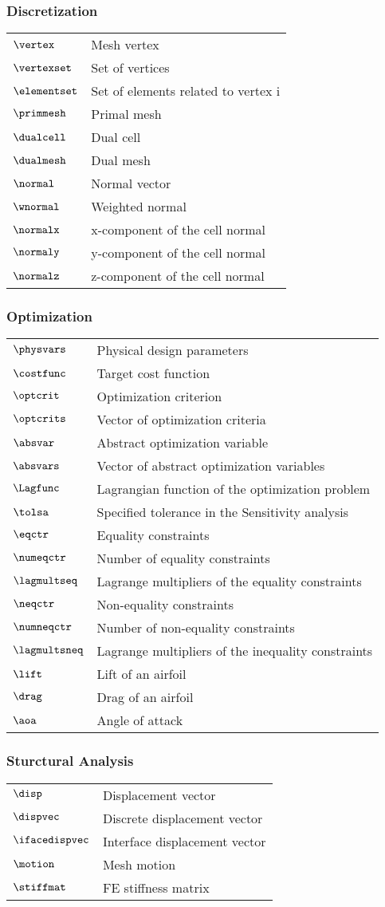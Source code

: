 \subsubsection*{Discretization}
\begin{tabular}{l l}
$\vertex$ & Mesh vertex\\
$\vertexset$ & Set of vertices\\
$\elementset$ & Set of elements related to vertex i\\
$\primmesh$ & Primal mesh\\
$\dualcell$ & Dual cell\\
$\dualmesh$ & Dual mesh\\
$\normal$ & Normal vector\\
$\wnormal$ & Weighted normal\\
$\normalx$ & x-component of the cell normal\\
$\normaly$ & y-component of the cell normal\\
$\normalz$ & z-component of the cell normal
\end{tabular}

\subsubsection*{Optimization}
\begin{tabular}{l l}
$\physvars$ & Physical design parameters\\
$\costfunc$ & Target cost function\\
$\optcrit$ & Optimization criterion\\
$\optcrits$ & Vector of optimization criteria\\
$\absvar$ & Abstract optimization variable\\
$\absvars$ & Vector of abstract optimization variables\\
$\Lagfunc$ & Lagrangian function of the optimization problem\\
$\tolsa$ & Specified tolerance in the Sensitivity analysis\\
$\eqctr$ & Equality constraints\\
$\numeqctr$ & Number of equality constraints\\
$\lagmultseq$ & Lagrange multipliers of the equality constraints\\
$\neqctr$ & Non-equality constraints\\
$\numneqctr$ & Number of non-equality constraints\\
$\lagmultsneq$ & Lagrange multipliers of the inequality constraints\\
$\lift$ & Lift of an airfoil\\
$\drag$ & Drag of an airfoil\\
$\aoa$ & Angle of attack
\end{tabular}

\subsubsection*{Sturctural Analysis}
\begin{tabular}{l l}
$\disp$ & Displacement vector\\
$\dispvec$ & Discrete displacement vector\\
$\ifacedispvec$ & Interface displacement vector\\
$\motion$ & Mesh motion\\
$\stiffmat$ & \ac{FE} stiffness matrix
\end{tabular}

